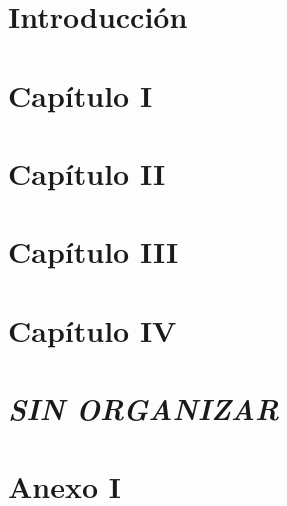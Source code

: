 \documentclass[a4paper,12pt,titlepage]{article}
\begin{document}
  \thispagestyle{empty} %
  \caratula
  \newpage

  \newpage

  \setcounter{secnumdepth}{4}
  \setcounter{tocdepth}{4}
  \setcounter{page}{1}
  
  \newpage
  \tableofcontents
  \newpage

  \setcounter{secnumdepth}{4}
  \section{Introducción}
  
  \newpage
  \section{Capítulo I}
  
  \newpage
  
  \newpage
  \section{Capítulo II}
  
  \newpage
  \section{Capítulo III}
  
  \newpage
  \section{Capítulo IV}
  
  \newpage

  \section{\textit{SIN ORGANIZAR}}
  
  \newpage

  \appendix
  \newpage
  \section{Anexo I}
  
  \newpage
  
  
  \newpage
  \printglossary[title={Glosario de términos}]
  \newpage
  \listoffigures
  \newpage
  \listoftables
\end{document}
